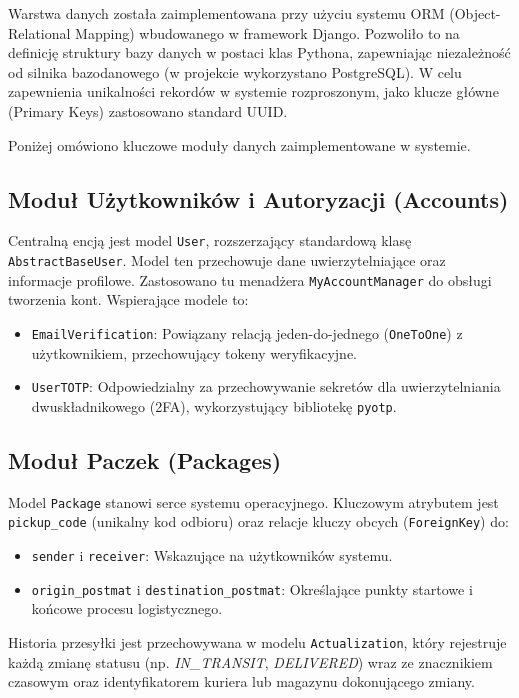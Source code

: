 Warstwa danych została zaimplementowana przy użyciu systemu ORM (Object-Relational Mapping) wbudowanego w framework Django. Pozwoliło to na definicję struktury bazy danych w postaci klas Pythona, zapewniając niezależność od silnika bazodanowego (w projekcie wykorzystano PostgreSQL). W celu zapewnienia unikalności rekordów w systemie rozproszonym, jako klucze główne (Primary Keys) zastosowano standard UUID.

Poniżej omówiono kluczowe moduły danych zaimplementowane w systemie.

\subsection{Moduł Użytkowników i Autoryzacji (Accounts)}
Centralną encją jest model \texttt{User}, rozszerzający standardową klasę \texttt{AbstractBaseUser}. Model ten przechowuje dane uwierzytelniające oraz informacje profilowe. Zastosowano tu menadżera \texttt{MyAccountManager} do obsługi tworzenia kont.
Wspierające modele to:
\begin{itemize}
    \item \texttt{EmailVerification}: Powiązany relacją jeden-do-jednego (\texttt{OneToOne}) z użytkownikiem, przechowujący tokeny weryfikacyjne.
    \item \texttt{UserTOTP}: Odpowiedzialny za przechowywanie sekretów dla uwierzytelniania dwuskładnikowego (2FA), wykorzystujący bibliotekę \texttt{pyotp}.
\end{itemize}

\subsection{Moduł Paczek (Packages)}
Model \texttt{Package} stanowi serce systemu operacyjnego. Kluczowym atrybutem jest \texttt{pickup\_code} (unikalny kod odbioru) oraz relacje kluczy obcych (\texttt{ForeignKey}) do:
\begin{itemize}
    \item \texttt{sender} i \texttt{receiver}: Wskazujące na użytkowników systemu.
    \item \texttt{origin\_postmat} i \texttt{destination\_postmat}: Określające punkty startowe i końcowe procesu logistycznego.
\end{itemize}
Historia przesyłki jest przechowywana w modelu \texttt{Actualization}, który rejestruje każdą zmianę statusu (np. \textit{IN\_TRANSIT}, \textit{DELIVERED}) wraz ze znacznikiem czasowym oraz identyfikatorem kuriera lub magazynu dokonującego zmiany.

